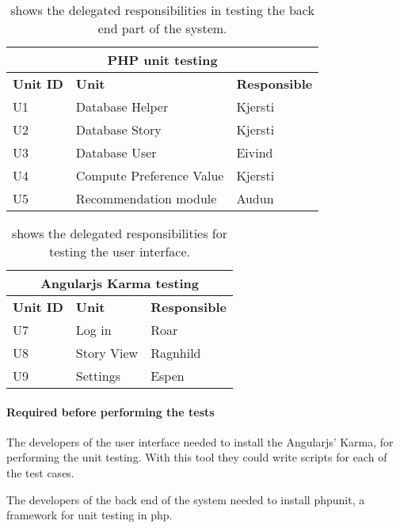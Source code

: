 \begin{table}[H]
	\begin{center}
		\begin{tabular}{ | l | l | l |}
			\hline
			\multicolumn{3}{|c|}{\textbf{PHP unit testing}} \\
			\hline
			\textbf{Unit ID} & \textbf{Unit} & \textbf{Responsible} \\ \hline
			U1 & Database Helper & Kjersti \\ \hline
			U2 & Database Story & Kjersti \\ \hline
			U3 & Database User & Eivind \\ \hline			
			U4 & Compute Preference Value & Kjersti \\ \hline			
			U5 & Recommendation module & Audun \\ \hline
		\end{tabular}
	\end{center}
	\caption{shows the delegated responsibilities in testing the back end part of the system.}
	\label{Tab:phptesting}
\end{table}

\begin{table}[H]
	\begin{center}
		\begin{tabular}{ | l | l | l |}
			\hline
			\multicolumn{3}{|c|}{\textbf{Angularjs Karma testing}} \\
			\hline
			\textbf{Unit ID} & \textbf{Unit} & \textbf{Responsible} \\ \hline
			U7 & Log in & Roar \\ \hline
			U8 & Story View & Ragnhild \\ \hline
			U9 & Settings & Espen \\ \hline
		\end{tabular}
	\end{center}
	\caption{shows the delegated responsibilities for testing the user interface.}
	\label{Tab:karmatesting}
\end{table}

\paragraph {Required before performing the tests}
The developers of the user interface needed to install the Angularjs' Karma, for performing the unit testing. With this tool they could write scripts for each of the test cases.\newline

The developers of the back end of the system needed to install phpunit, a framework for unit testing in php.\newline

